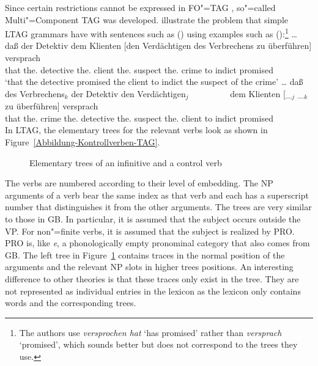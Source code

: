 Since certain restrictions cannot be expressed in FO"=TAG \citep[--50]{Rambow94a},
so"=called Multi"=Component TAG was developed. \citet*{JBR2000a} illustrate the problem that
simple LTAG grammars have with sentences such as () using examples such as
():\footnote{%
  The authors use \emph{versprochen hat} `has promised' rather than \emph{versprach} `promised', which sounds better but does not correspond
  to the trees they use.
}
\eal
\ex 
\gll \ldots{} daß  der        Detektiv  dem        Klienten [den Verdächtigen des Verbrechens zu überführen] versprach\\
         {}   that the.\nom{} detective the.\dat{} client   \spacebr{}the.\acc{} suspect the.\gen{} crime to indict promised\\
  \glt `that the detective promised the client to indict the suspect of the crime'
\ex\label{Beispiel-Joshi-NP4} 
\gll \ldots{} daß  des        Verbrechens$_k$ der        Detektiv  den Verdächtigen$_j$~~~~~~~~~ dem         Klienten [\_$_j$ \_$_k$ zu überführen] versprach\\
      {}      that the.\gen{} crime           the.\nom{} detective the.\acc{} suspect   the.\dat{}  client   {}      {}     to indict      promised\\
\zl
\largerpage
In LTAG, the elementary trees for the relevant verbs look as shown in Figure~\vref{Abbildung-Kontrollverben-TAG}.
\begin{figure}
\caption{\label{Abbildung-Kontrollverben-TAG}Elementary trees of an infinitive and a control verb} 
\end{figure}%
The verbs are numbered according to their level of embedding. The NP arguments of a verb bear the same index as that verb
and each has a superscript number that distinguishes it from the other arguments.
The trees are very similar to those in GB\indexgb. In particular, it is assumed that the subject occurs outside the VP.
For non"=finite verbs, it is assumed that the subject is realized by PRO. PRO is, like \emph{e}, a phonologically empty pronominal
category that also comes from GB.
The left tree in Figure~\ref{Abbildung-Kontrollverben-TAG} contains traces in the normal position of the arguments and the relevant
NP slots in higher trees positions. An interesting difference to other theories is that these traces only exist in the tree. They are not
represented as individual entries in the lexicon as the lexicon only contains words and the corresponding trees.

